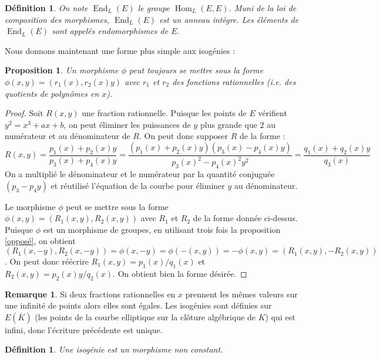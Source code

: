 \documentclass{article}
\theoremstyle{plain}%
\newtheorem{prop}[thm]{Proposition}
\newtheorem{deff}[thm]{Définition}
\theoremstyle{definition}%
\newtheorem{rem}[thm]{Remarque}
\DeclareMathOperator{\End}{End}
\DeclareMathOperator{\Hom}{Hom}
\begin{document}
\begin{deff}
  On note $\End_L(E)$ le groupe $\Hom_L(E, E)$. Muni de la loi de composition des morphismes, $\End_L(E)$ est un anneau intègre. Les éléments de $\End_L(E)$ sont appelés endomorphismes de $E$.
\end{deff}


 Nous donnons maintenant une forme plus simple aux isogénies :


\begin{prop}
  Un morphisme $\phi$ peut toujours se mettre sous la forme $\phi(x, y) = (r_1(x), r_2(x)y)$ avec $r_1$ et $r_2$ des fonctions rationnelles (i.e. des quotients de polynômes en $x$).
\end{prop}

\begin{proof}
  Soit $R(x, y)$ une fraction rationnelle. Puisque les points de $E$ vérifient $y^2 = x^3 + ax + b$, on peut éliminer les puissances de $y$ plus grande que $2$ au numérateur et au dénominateur de $R$. On peut donc supposer $R$ de la forme : $$R(x, y) = \frac{p_1(x) + p_2(x)y}{p_3(x)+p_4(x)y} = \frac{(p_1(x) + p_2(x)y)(p_3(x)-p_4(x)y)}{p_3(x)^2 - p_4(x)^2y^2} = \frac{q_1(x) +q_2(x)y}{q_3(x)} $$
 On a multiplié le dénominateur et le numérateur par la quantité conjuguée $(p_3-p_4y)$ et réutilisé l'équation de la courbe pour éliminer $y$ au dénominateur.

 Le morphisme $\phi$ peut se mettre sous la forme $\phi(x, y) = (R_1(x, y), R_2(x, y))$ avec $R_1$ et $R_2$ de la forme donnée ci-dessus. Puisque $\phi$ est un morphisme de groupes, en utilisant trois fois la proposition \ref{opposé}, on obtient
 $(R_1(x, -y), R_2(x, -y)) = \phi(x, -y) = \phi(-(x, y)) = -\phi(x, y) = (R_1(x, y), -R_2(x, y))$. On peut donc réécrire $R_1(x, y) = p_1(x) / q_1(x)$ et $R_2(x, y) = p_2(x)y/q_2(x)$. On obtient bien la forme désirée.
\end{proof}

\begin{rem}
  Si deux fractions rationnelles en $x$ prennent les mêmes valeurs sur une infinité de points alors elles sont égales. Les isogénies sont définies sur $E(\overline{K})$ (les points de la courbe elliptique sur la clôture algébrique de $K$) qui est infini, donc l'écriture précédente est unique.
\end{rem}


\begin{deff}
  Une isogénie est un morphisme non constant.
\end{deff}
\end{document}
